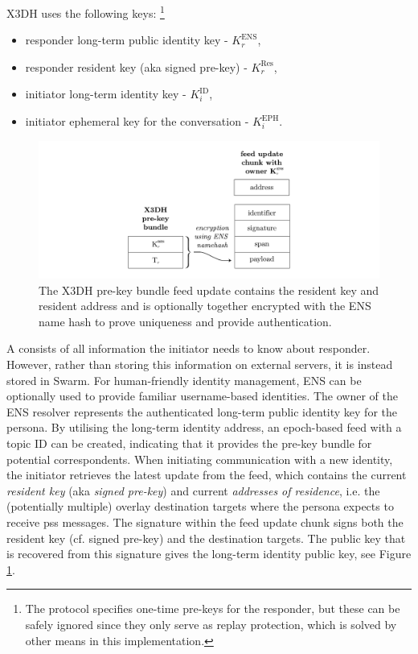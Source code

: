 X3DH uses the following keys:%
%
\footnote{The protocol specifies one-time pre-keys for the responder, but these can be safely ignored since they only serve as replay protection, which is solved by other means in this implementation.}

\begin{itemize}[noitemsep]
\item responder long-term public identity key - $K^{\mathrm{ENS}}_r$,
\item responder resident key (aka signed pre-key) - $K^{\mathrm{Res}}_r$,
\item initiator long-term identity key - $K^{\mathrm{ID}}_i$,
\item initiator ephemeral key for the conversation - $K^{\mathrm{EPH}}_i$.
\end{itemize}{}



\begin{figure}[htbp]
   \centering
   \includegraphics[width=\textwidth]{fig/prekey-bundle-feed-update.pdf}
   \caption[X3DH pre-key bundle feed update \statusgreen]{The X3DH pre-key bundle feed update contains the resident key and resident address and is optionally together encrypted with the ENS name hash to prove uniqueness and provide authentication.}
\label{fig:prekey-bundle-feed-update}
\end{figure}


A  consists of all information the initiator needs to know about responder. However, rather than storing this information on external servers, it is instead stored in Swarm. For human-friendly identity management, ENS can be optionally used to provide familiar username-based identities. The owner of the ENS resolver represents the authenticated long-term public identity key for the persona. By utilising the long-term identity address, an epoch-based feed with a topic ID can be created, indicating that it provides the pre-key bundle for potential correspondents. When initiating communication with a new identity, the initiator retrieves the latest update from the feed, which contains the current \emph{resident key} (aka \emph{signed pre-key}) and current \emph{addresses of residence}, i.e. the (potentially multiple) overlay destination targets where the persona expects to receive pss messages. The signature within the feed update chunk signs both the resident key (cf. signed pre-key) and the destination targets. The public key that is recovered from this signature gives the long-term identity public key, see Figure \ref{fig:prekey-bundle-feed-update}.


